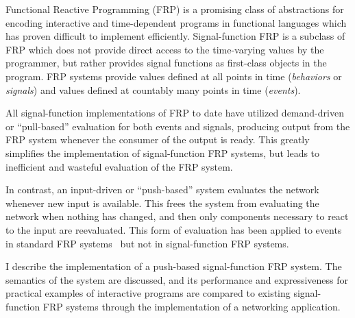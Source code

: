 Functional Reactive Programming (FRP) is a promising class of abstractions for encoding interactive and time-dependent programs in
functional languages which has proven difficult to implement efficiently. Signal-function FRP is a subclass of FRP which does not provide
direct access to the time-varying values by the programmer, but rather provides signal functions as first-class objects in the
program. FRP systems provide values defined at all points in time ({\em behaviors} or {\em signals}) and values defined
at countably many points in time ({\em events}).

All signal-function implementations of FRP to date have utilized demand-driven or ``pull-based''  evaluation for both events and signals,
producing output from the FRP system whenever the consumer of the output is ready. This greatly simplifies the implementation of signal-function
FRP systems, but leads to inefficient and wasteful evaluation of the FRP system.

In contrast, an input-driven or ``push-based'' system evaluates the network whenever new input is available. This frees the system from
evaluating the network when nothing has changed, and then only components necessary to react to the input are reevaluated.
This form of evaluation has been applied to events in standard FRP systems~\cite{Elliott2009} but not in signal-function FRP systems.

I describe the implementation of a push-based signal-function FRP system. The semantics of the system are discussed, and its performance
and expressiveness for practical examples of interactive programs are compared to existing signal-function FRP systems through the
implementation of a networking application.
